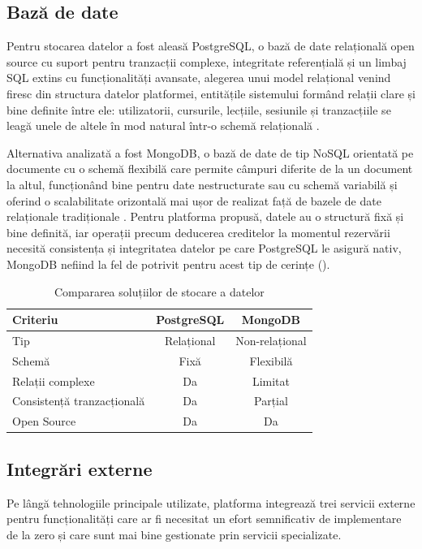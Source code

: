\subsection{Bază de date}
Pentru stocarea datelor a fost aleasă PostgreSQL, o bază de date relațională open source cu suport pentru tranzacții complexe, integritate referențială și un limbaj SQL extins cu funcționalități avansate, alegerea unui model relațional venind firesc din structura datelor platformei, entitățile sistemului formând relații clare și bine definite între ele: utilizatorii, cursurile, lecțiile, sesiunile și tranzacțiile se leagă unele de altele în mod natural într-o schemă relațională \cite{postgresql}.

Alternativa analizată a fost MongoDB, o bază de date de tip NoSQL orientată pe documente cu o schemă flexibilă care permite câmpuri diferite de la un document la altul, funcționând bine pentru date nestructurate sau cu schemă variabilă și oferind o scalabilitate orizontală mai ușor de realizat față de bazele de date relaționale tradiționale \cite{mongodb}. Pentru platforma propusă, datele au o structură fixă și bine definită, iar operații precum deducerea creditelor la momentul rezervării necesită consistența și integritatea datelor pe care PostgreSQL le asigură nativ, MongoDB nefiind la fel de potrivit pentru acest tip de cerințe ().

\begin{table}[htbp]
    \centering
    \small
    \begin{tabular}{l c c}
        \toprule
        \textbf{Criteriu} & \textbf{PostgreSQL} & \textbf{MongoDB} \\
        \midrule
        Tip & Relațional & Non-relațional \\
        Schemă & Fixă & Flexibilă \\
        Relații complexe & Da & Limitat \\
        Consistență tranzacțională & Da & Parțial \\
        Open Source & Da & Da \\
        \bottomrule
    \end{tabular}
    \caption{Compararea soluțiilor de stocare a datelor}
    \label{tab:database-comparison}
\end{table}

\subsection{Integrări externe}
Pe lângă tehnologiile principale utilizate, platforma integrează trei servicii externe pentru funcționalități care ar fi necesitat un efort semnificativ de implementare de la zero și care sunt mai bine gestionate prin servicii specializate.

